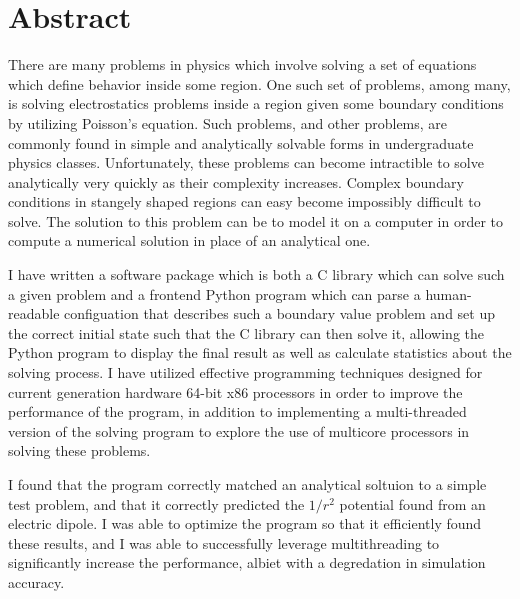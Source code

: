 \documentclass[12pt]{article}
\begin{document}
\section*{Abstract}

\doublespacing

There are many problems in physics which involve solving a set of equations which define behavior
inside some region. One such set of problems, among many, is solving electrostatics problems inside
a region given some boundary conditions by utilizing Poisson's equation. Such problems, and other
problems, are commonly found in simple and analytically solvable forms in undergraduate physics classes.
Unfortunately, these problems can become intractible to solve analytically very quickly as their complexity
increases. Complex boundary conditions in stangely shaped regions can easy become impossibly difficult to
solve. The solution to this problem can be to model it on a computer in order to compute a numerical solution
in place of an analytical one.

I have written a software package which is both a C library which can solve such a given problem and a frontend
Python program which can parse a human-readable configuation that describes such a boundary value problem and
set up the correct initial state such that the C library can then solve it, allowing the Python program to
display the final result as well as calculate statistics about the solving process. I have utilized effective
programming techniques designed for current generation hardware 64-bit x86 processors in order to improve
the performance of the program, in addition to implementing a multi-threaded version of the solving program
to explore the use of multicore processors in solving these problems.

I found that the program correctly matched an analytical soltuion to a simple test problem, and that it correctly
predicted the $1/r^2$ potential found from an electric dipole. I was able to optimize the program so that it
efficiently found these results, and I was able to successfully leverage multithreading to significantly increase
the performance, albiet with a degredation in simulation accuracy.

\clearpage
\doublespacing







\end{document}

